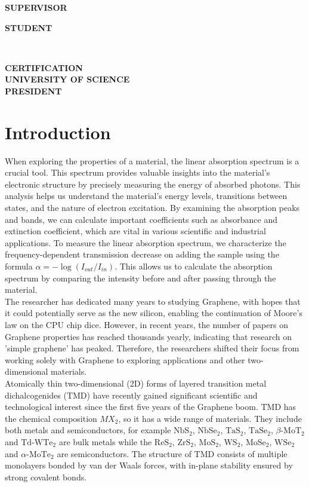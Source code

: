 \documentclass[12pt,english,a4paper]{article}
\begin{document}
\parbox{1.5in}{\centering \textbf{SUPERVISOR}} \hfill \parbox{1.5in}{\centering \textbf{STUDENT}}

\vspace{5\baselineskip}

\hfill\\\null\begin{center}
	
	\parbox{3.in}{\centering \textbf{CERTIFICATION\\ UNIVERSITY OF SCIENCE\\PRESIDENT}}
	\noindent 
\end{center}
	\newpage
	\section{Introduction}
\quad When exploring the properties of a material, the linear absorption spectrum is a crucial tool. This spectrum provides valuable insights into the material's electronic structure by precisely measuring the energy of absorbed photons. This analysis helps us understand the material's energy levels, transitions between states, and the nature of electron excitation. By examining the absorption peaks and bands, we can calculate important coefficients such as absorbance and extinction coefficient, which are vital in various scientific and industrial applications. To measure the linear absorption spectrum, we characterize the frequency-dependent transmission decrease on adding the sample using the formula $\alpha = -\log(I_{out}/I_{in})$. This allows us to calculate the absorption spectrum by comparing the intensity before and after passing through the material.\\\null
\quad  The researcher has dedicated many years to studying Graphene, with hopes that it could potentially serve as the new silicon, enabling the continuation of Moore's law on the CPU chip dice. However, in recent years, the number of papers on Graphene properties has reached thousands yearly, indicating that research on 'simple graphene' has peaked. \cite{geim_van_2013} Therefore, the researchers shifted their focus from working solely with Graphene to exploring applications and other two-dimensional materials. \\\null
\quad Atomically thin two-dimensional (2D) forms of layered transition metal dichalcogenides (TMD) have recently gained significant scientific and technological interest since the first five years of the Graphene boom.\cite{wang_electronics_2012,geim_van_2013} TMD has the chemical composition $MX_2$, so it has a wide range of materials. They include both metals and semiconductors, for example $\mathrm{NbS}_2$, $\mathrm{NbSe}_2$, $\mathrm{TaS}_2$, $\mathrm{TaSe}_2$, $\beta$-$\mathrm{MoT}_2$ and $\mathrm{Td}$-$\mathrm{WTe}_2$ are bulk metals while the $\mathrm{ReS}_2$, $\mathrm{ZrS}_2$, $\mathrm{MoS}_2$, $\mathrm{WS}_2$, $\mathrm{MoSe}_2$, $\mathrm{WSe}_2$ and $\alpha$-$\mathrm{MoTe}_2$ are semiconductors. The structure of TMD consists of multiple monolayers bonded by van der Waals forces, with in-plane stability ensured by strong covalent bonds.
\end{document}
